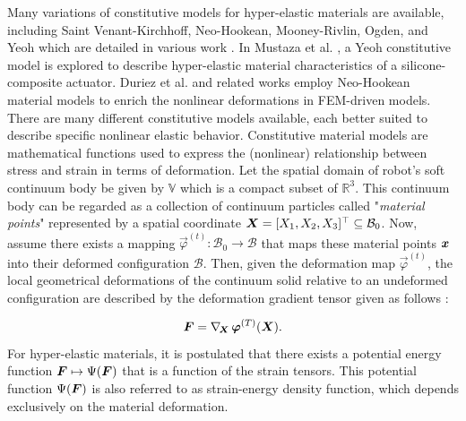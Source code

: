 Many variations of constitutive models for hyper-elastic materials are available, including Saint Venant-Kirchhoff, Neo-Hookean, Mooney-Rivlin, Ogden, and Yeoh  which are detailed in various work \cite{Meyer2009,Renaud2011,Kim2018}. In Mustaza et al. \cite{Mustaza2019}, a Yeoh constitutive model is explored to describe hyper-elastic material characteristics of a silicone-composite actuator. Duriez et al. \cite{Duriez2013} and related works \cite{Coevoet2017,Largilliere2015} employ Neo-Hookean material models to enrich the nonlinear deformations in FEM-driven models. There are many different constitutive models available, each better suited to describe specific nonlinear elastic behavior. Constitutive material models are mathematical functions used to express the (nonlinear) relationship between stress and strain in terms of deformation.  Let the spatial domain of robot's soft continuum body be given by $\mathbb{V}$ which is a compact subset of $\mathbb{R}^3$. This continuum body can be regarded as a collection of continuum particles called "\textit{material points}" represented by a spatial coordinate ${\boldsymbol{X}} = [X_1, X_2, X_3]^\top \subseteq \mathcal{B}_0$. Now, assume there exists a mapping $\vec{\varphi}^{(t)}: \mathcal{B}_0 \to \mathcal{B}$ that maps these material points ${\boldsymbol{x}}$ into their deformed configuration $\mathcal{B}$. Then, given the deformation map $\vec{\varphi}^{(t)}$, the local geometrical deformations of the continuum solid relative to an undeformed configuration are described by the deformation gradient tensor given as follows \cite{Holzapfel2002,Kim2018}: \vspace{-3mm}

\begin{equation}
\boldsymbol{F} = \nabla_{\!{\boldsymbol{X}}}\,\boldsymbol{\varphi}^{(T)}({\boldsymbol{X}}).
\end{equation}
%
For hyper-elastic materials, it is postulated that there exists a potential energy function $\boldsymbol{F} \mapsto \Psi(\boldsymbol{F})$ that is a function of the strain tensors. This potential function $\Psi(\boldsymbol{F})$ is also referred to as strain-energy density function, which depends exclusively on the material deformation.

